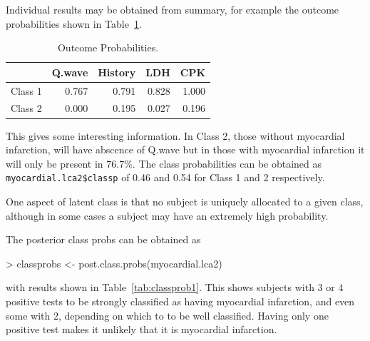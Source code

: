 Individual results may be obtained from summary, for example the outcome probabilities shown in Table~\ref{tab:outcomep1}.
\begin{Schunk}
\end{Schunk}



\begin{table}[ht]
\centering
\begin{tabular}{rrrrr}
  \hline
 & Q.wave & History & LDH & CPK \\ 
  \hline
Class  1 & 0.767 & 0.791 & 0.828 & 1.000 \\ 
  Class  2 & 0.000 & 0.195 & 0.027 & 0.196 \\ 
   \hline
\end{tabular}
\caption{Outcome Probabilities.} 
\label{tab:outcomep1}
\end{table}


This gives some interesting information. In Class 2, those without myocardial infarction, will have abscence of Q.wave but in those with myocardial infarction it will only be present in 76.7\%. The class probabilities can be obtained as \texttt{myocardial.lca2\$classp} of 0.46 and 0.54 for Class 1 and 2 respectively.


One aspect of latent class is that no subject is uniquely allocated to a given class, although in some cases a subject may have an extremely high probability.

The posterior class probs can be obtained as

\begin{Schunk}
\begin{Sinput}
> classprobs <- post.class.probs(myocardial.lca2)
\end{Sinput}
\end{Schunk}

with results shown in Table~\ref{tab:classprob1}. This shows subjects with 3 or 4 positive tests to be strongly classified as having myocardial infarction, and even some with 2, depending on which to to be well classified. Having only one positive test makes it unlikely that it is myocardial infarction.



